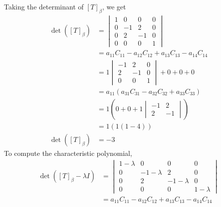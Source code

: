 \documentclass[13pt]{article}
\begin{document}
\begin{enumerate}[label=(\alph*),leftmargin=*]
  Taking the determinant of $[T]_\beta$, we get
  \begin{align*}
    \det([T]_\beta) &=
                      \begin{vmatrix}
                        1 & 0 & 0 & 0 \\
                        0 & -1 & 2 & 0 \\
                        0 & 2 & -1 & 0 \\
                        0 & 0 & 0 & 1                        
                      \end{vmatrix} \\
                    &= a_{11}C_{11} - a_{12}C_{12} + a_{13}C_{13} - a_{14}C_{14} \\
                    &= 1
                      \begin{vmatrix}
                        -1 & 2 & 0 \\
                        2 & -1 & 0 \\
                        0 & 0 & 1
                      \end{vmatrix} + 0 + 0 + 0 \\
                    &= a_{11}(a_{31}C_{31} - a_{32}C_{32} + a_{33}C_{33}) \\
                    &= 1\left(0 + 0 + 1
                      \begin{vmatrix}
                        -1 & 2 \\
                        2 & -1
                      \end{vmatrix}\right) \\
                    &= 1(1(1 - 4)) \\
    \det([T]_\beta) &= -3
  \end{align*}
  To compute the characteristic polynomial,
  \begin{align*}
    \det([T]_\beta - \lambda I) &=
                                  \begin{vmatrix}
                                    1 - \lambda & 0 & 0 & 0 \\
                                    0 & -1 - \lambda & 2 & 0 \\
                                    0 & 2 & -1 - \lambda & 0 \\
                                    0 & 0 & 0 & 1 - \lambda
                                  \end{vmatrix} \\
                                &= a_{11}C_{11} - a_{12}C_{12} + a_{13}C_{13} - a_{14}C_{14} \\

\end{align*}
\end{enumerate}
\end{document}
